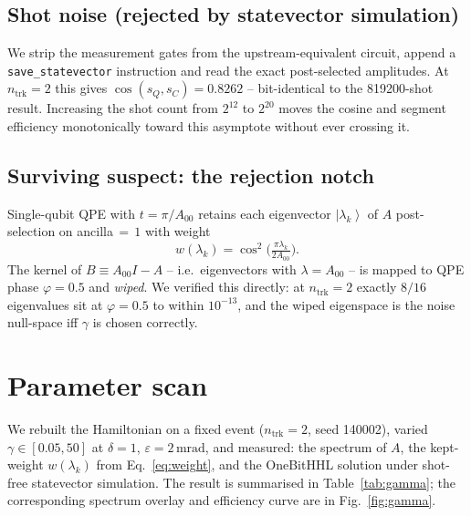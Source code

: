 \documentclass[a4paper,11pt]{article}
\providecommand{\ket}[1]{\left|#1\right\rangle}
\newcommand{\SI}[2]{#1\,#2}
\newcommand{\milli}{\mathrm{m}}
\newcommand{\radian}{\mathrm{rad}}
\newcommand{\num}[1]{#1}
\begin{document}
\subsection{Shot noise (rejected by statevector simulation)}
We strip the measurement gates from the upstream-equivalent circuit, append a
\texttt{save\_statevector} instruction and read the exact post-selected amplitudes.
At $n_\mathrm{trk}{=}2$ this gives $\cos(s_Q, s_C) = 0.8262$ -- bit-identical to the
\num{819200}-shot result. Increasing the shot count from $2^{12}$ to $2^{20}$ moves the
cosine and segment efficiency monotonically toward this asymptote without ever crossing it.

\subsection{Surviving suspect: the rejection notch}
Single-qubit QPE with $t = \pi / A_{00}$ retains each eigenvector $\ket{\lambda_k}$ of $A$
post-selection on ancilla$\,=\,1$ with weight
\begin{equation}\label{eq:weight}
  w(\lambda_k) = \cos^2\!\Big(\tfrac{\pi \lambda_k}{2 A_{00}}\Big).
\end{equation}
The kernel of $B \equiv A_{00} I - A$ -- i.e.\ eigenvectors with $\lambda = A_{00}$ -- is
mapped to QPE phase $\varphi = 0.5$ and \emph{wiped}. We verified this directly: at
$n_\mathrm{trk}{=}2$ exactly $8/16$ eigenvalues sit at $\varphi = 0.5$ to within
$10^{-13}$, and the wiped eigenspace is the noise null-space iff $\gamma$ is chosen
correctly.

\section{Parameter scan}\label{sec:scan}
We rebuilt the Hamiltonian on a fixed event ($n_\mathrm{trk}{=}2$, seed \num{140002}),
varied $\gamma \in [0.05, 50]$ at $\delta{=}1$, $\varepsilon{=}\SI{2}{\milli\radian}$,
and measured: the spectrum of $A$, the kept-weight $w(\lambda_k)$ from
Eq.~\eqref{eq:weight}, and the OneBitHHL solution under shot-free statevector
simulation. The result is summarised in Table~\ref{tab:gamma}; the corresponding
spectrum overlay and efficiency curve are in Fig.~\ref{fig:gamma}.
\end{document}
